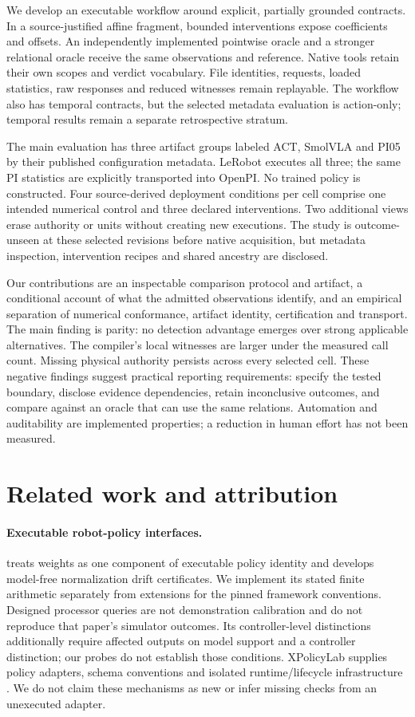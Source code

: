 We develop an executable workflow around explicit, partially grounded contracts. In a source-justified affine fragment, bounded interventions expose coefficients and offsets. An independently implemented pointwise oracle and a stronger relational oracle receive the same observations and reference. Native tools retain their own scopes and verdict vocabulary. File identities, requests, loaded statistics, raw responses and reduced witnesses remain replayable. The workflow also has temporal contracts, but the selected metadata evaluation is action-only; temporal results remain a separate retrospective stratum.

The main evaluation has three artifact groups labeled ACT, SmolVLA and PI05 by their published configuration metadata. LeRobot executes all three; the same PI statistics are explicitly transported into OpenPI. No trained policy is constructed. Four source-derived deployment conditions per cell comprise one intended numerical control and three declared interventions. Two additional views erase authority or units without creating new executions. The study is outcome-unseen at these selected revisions before native acquisition, but metadata inspection, intervention recipes and shared ancestry are disclosed.

Our contributions are an inspectable comparison protocol and artifact, a conditional account of what the admitted observations identify, and an empirical separation of numerical conformance, artifact identity, certification and transport. The main finding is parity: no detection advantage emerges over strong applicable alternatives. The compiler's local witnesses are larger under the measured call count. Missing physical authority persists across every selected cell. These negative findings suggest practical reporting requirements: specify the tested boundary, disclose evidence dependencies, retain inconclusive outcomes, and compare against an oracle that can use the same relations. Automation and auditability are implemented properties; a reduction in human effort has not been measured.

\section{Related work and attribution}
\paragraph{Executable robot-policy interfaces.}
\citet{tai2026execspec} treats weights as one component of executable policy identity and develops model-free normalization drift certificates. We implement its stated finite arithmetic separately from extensions for the pinned framework conventions. Designed processor queries are not demonstration calibration and do not reproduce that paper's simulator outcomes. Its controller-level distinctions additionally require affected outputs on model support and a controller distinction; our probes do not establish those conditions. XPolicyLab supplies policy adapters, schema conventions and isolated runtime/lifecycle infrastructure \citep{xpolicylab2026}. We do not claim these mechanisms as new or infer missing checks from an unexecuted adapter.

